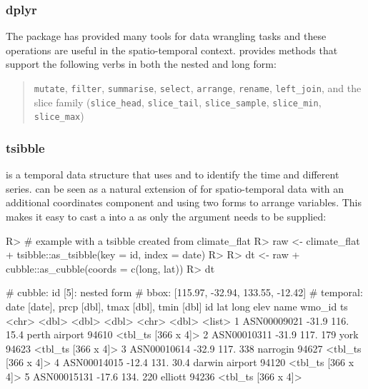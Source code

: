 \documentclass[
]{jss}
\begin{document}
\hypertarget{dplyr}{%
\subsubsection{dplyr}\label{dplyr}}

The  package has provided many tools for data wrangling
tasks and these operations are useful in the spatio-temporal context.
 provides methods that support the following 
verbs in both the nested and long form:

\begin{quote}
\texttt{mutate}, \texttt{filter}, \texttt{summarise}, \texttt{select},
\texttt{arrange}, \texttt{rename}, \texttt{left\_join}, and the slice
family (\texttt{slice\_head}, \texttt{slice\_tail},
\texttt{slice\_sample}, \texttt{slice\_min}, \texttt{slice\_max})
\end{quote}

\hypertarget{tsibble}{%
\subsubsection{tsibble}\label{tsibble}}

 is a temporal data structure that uses  and
 to identify the time and different series.  can
be seen as a natural extension of  for spatio-temporal
data with an additional coordinates component and using two forms to
arrange variables. This makes it easy to cast a  into a
 as only the  argument needs to be supplied:

\begin{CodeChunk}
\begin{CodeInput}
R> # example with a tsibble created from climate_flat
R> raw <- climate_flat %
+   tsibble::as_tsibble(key = id, index = date)
R> 
R> dt <-  raw %
+   cubble::as_cubble(coords = c(long, lat))
R> dt
\end{CodeInput}
\begin{CodeOutput}
# cubble:   id [5]: nested form
# bbox:     [115.97, -32.94, 133.55, -12.42]
# temporal: date [date], prcp [dbl], tmax [dbl], tmin [dbl]
  id            lat  long  elev name           wmo_id ts                
  <chr>       <dbl> <dbl> <dbl> <chr>           <dbl> <list>            
1 ASN00009021 -31.9  116.  15.4 perth airport   94610 <tbl_ts [366 x 4]>
2 ASN00010311 -31.9  117. 179   york            94623 <tbl_ts [366 x 4]>
3 ASN00010614 -32.9  117. 338   narrogin        94627 <tbl_ts [366 x 4]>
4 ASN00014015 -12.4  131.  30.4 darwin airport  94120 <tbl_ts [366 x 4]>
5 ASN00015131 -17.6  134. 220   elliott         94236 <tbl_ts [366 x 4]>
\end{CodeOutput}
\end{CodeChunk}
\end{document}
